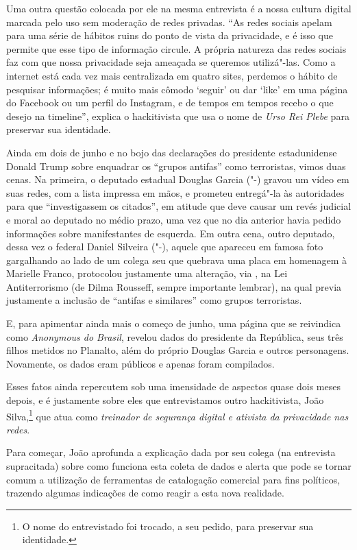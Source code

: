 Uma outra questão colocada por ele na mesma entrevista é a nossa cultura
digital marcada pelo uso sem moderação de redes privadas. ``As redes
sociais apelam para uma série de hábitos ruins do ponto de vista da
privacidade, e é isso que permite que esse tipo de informação circule. A
própria natureza das redes sociais faz com que nossa privacidade seja
ameaçada se queremos utilizá"-las. Como a internet está cada vez mais
centralizada em quatro sites, perdemos o hábito de pesquisar
informações; é muito mais cômodo `seguir' ou dar `like' em uma página do
Facebook ou um perfil do Instagram, e de tempos em tempos recebo o que
desejo na timeline'', explica o hackitivista que usa o nome de
\emph{Urso Rei Plebe} para preservar sua identidade.

Ainda em dois de junho e no bojo das declarações do presidente
estadunidense Donald Trump sobre enquadrar os ``grupos antifas'' como
terroristas, vimos duas cenas. Na primeira, o deputado estadual Douglas
Garcia ("-) gravou um vídeo em suas redes, com a lista impressa em
mãos, e prometeu entregá"-la às autoridades para que ``investigassem os
citados'', em atitude que deve causar um revés judicial e moral ao
deputado no médio prazo, uma vez que no dia anterior havia pedido
informações sobre manifestantes de esquerda. Em outra cena, outro
deputado, dessa vez o federal Daniel Silveira ("-), aquele que
apareceu em famosa foto gargalhando ao lado de um colega seu que
quebrava uma placa em homenagem à Marielle Franco, protocolou justamente
uma alteração, via , na Lei Antiterrorismo (de Dilma Rousseff, sempre
importante lembrar), na qual previa justamente a inclusão de
``antifas e similares'' como grupos terroristas.

E, para apimentar ainda mais o começo de junho, uma página que se
reivindica como \emph{Anonymous do Brasil}, revelou dados do presidente
da República, seus três filhos metidos no Planalto, além do próprio
Douglas Garcia e outros personagens. Novamente, os dados eram públicos e
apenas foram compilados.

Esses fatos ainda repercutem sob uma imensidade de aspectos quase dois
meses depois, e é justamente sobre eles que entrevistamos outro
hackitivista, João Silva,\footnote{O nome do entrevistado foi trocado, a seu pedido, para preservar sua identidade.} que atua como \emph{treinador de
segurança digital e ativista da privacidade nas redes}.

Para começar, João aprofunda a explicação dada por seu colega (na
entrevista supracitada) sobre como funciona esta coleta de dados e
alerta que pode se tornar comum a utilização de ferramentas de
catalogação comercial para fins políticos, trazendo algumas indicações
de como reagir a esta nova realidade.

